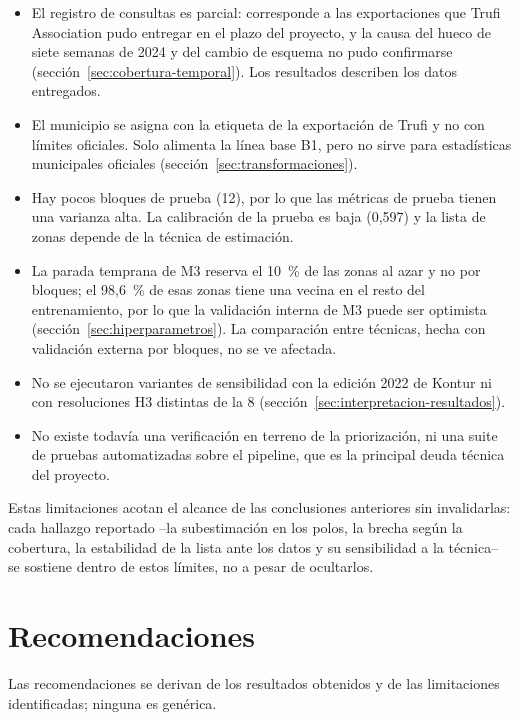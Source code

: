 \begin{itemize}
        localiza una brecha de \emph{información}, no una ausencia real de transporte.
  \item El registro de consultas es parcial: corresponde a las exportaciones que Trufi
        Association pudo entregar en el plazo del proyecto, y la causa del hueco de siete
        semanas de 2024 y del cambio de esquema no pudo confirmarse
        (sección~\ref{sec:cobertura-temporal}). Los resultados describen los datos
        entregados.
  \item El municipio se asigna con la etiqueta de la exportación de Trufi y no con límites
        oficiales. Solo alimenta la línea base B1, pero no sirve para estadísticas
        municipales oficiales (sección~\ref{sec:transformaciones}).
  \item Hay pocos bloques de prueba (12), por lo que las métricas de prueba tienen una
        varianza alta. La calibración de la prueba es baja (0,597) y la lista de zonas
        depende de la técnica de estimación.
  \item La parada temprana de M3 reserva el 10~\% de las zonas al azar y no por bloques; el
        98,6~\% de esas zonas tiene una vecina en el resto del entrenamiento, por lo que la
        validación interna de M3 puede ser optimista (sección~\ref{sec:hiperparametros}). La
        comparación entre técnicas, hecha con validación externa por bloques, no se ve
        afectada.
  \item No se ejecutaron variantes de sensibilidad con la edición 2022 de Kontur ni con
        resoluciones H3 distintas de la 8 (sección~\ref{sec:interpretacion-resultados}).
  \item No existe todavía una verificación en terreno de la priorización, ni una suite de
        pruebas automatizadas sobre el pipeline, que es la principal deuda técnica del
        proyecto.
\end{itemize}

Estas limitaciones acotan el alcance de las conclusiones anteriores sin invalidarlas: cada
hallazgo reportado --la subestimación en los polos, la brecha según la cobertura, la
estabilidad de la lista ante los datos y su sensibilidad a la técnica-- se sostiene dentro de
estos límites, no a pesar de ocultarlos.

\section{Recomendaciones}
\label{sec:recomendaciones}

Las recomendaciones se derivan de los resultados obtenidos y de las limitaciones
identificadas; ninguna es genérica.

